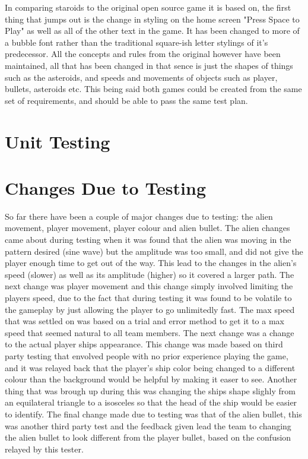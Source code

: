 \documentclass[12pt, titlepage]{article}
\begin{document}
In comparing staroids to the original open source game it is based on, the first thing that jumps out is the change in styling on the home screen "Press Space to Play" as well as all of the other text in the game. It has been changed to more of a bubble font rather than the traditional square-ish letter stylings of it's predecessor. All the concepts and rules from the original however have been maintained, all that has been changed in that sence is just the shapes of things such as the asteroids, and speeds and movements of objects such as player, bullets, asteroids etc. This being said both games could be created from the same set of requirements, and should be able to pass the same test plan.

\section{Unit Testing}
\section{Changes Due to Testing}
So far there have been a couple of major changes due to testing: the alien movement, player movement, player colour and alien bullet. The alien changes came about during testing when it was found that the alien was moving in the pattern desired (sine wave) but the amplitude was too small, and did not give the player enough time to get out of the way. This lead  to the changes in the alien's speed (slower) as well as its amplitude (higher) so it covered a larger path. The next change was player movement and this change simply involved limiting the players speed, due to the fact that during testing it was found to be volatile to the gameplay by just allowing the player to go unlimitedly fast. The max speed that was settled on was based on a trial and error method to get it to a max speed that seemed natural to all team members. The next change was a change to the actual player ships appearance. This change was made based on third party testing that envolved people with no prior experience playing the game, and it was relayed back that the player's ship color being changed to a different colour than the background would be helpful by making it easer to see. Another thing that was brough up during this was changing the ships shape slighly from an equilateral triangle to a isosceles so that the head of the ship would be easier to identify. The final change made due to testing was that of the alien bullet, this was another third party test and the feedback given lead the team to changing the alien bullet to look  different from the player bullet, based on the confusion relayed by this tester.
\end{document}
